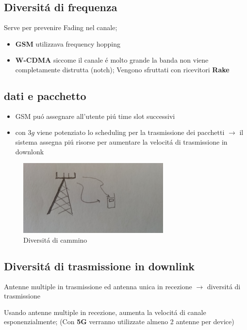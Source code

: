 \documentclass{article}
\begin{document}
\subsection{Diversit\'a di frequenza}
Serve per prevenire Fading nel canale;
\begin{itemize}
    \item \textbf{GSM} utilizzava frequency hopping
    \item \textbf{W-CDMA} siccome il canale \'e molto grande la banda non viene completamente distrutta (notch); Vengono sfruttati con ricevitori \textbf{Rake}
\end{itemize}

\subsection{dati e pacchetto}

\begin{itemize}
    \item GSM pu\'o assegnare all'utente pi\'u time slot successivi
    \item con \textbf{$3g$} viene potenziato lo scheduling per la trasmissione dei pacchetti $\rightarrow$ il sistema assegna pi\'u risorse per aumentare la velocit\'a di trasmissione in downlonk
\end{itemize}

\begin{figure}[h]
    \centering
    \includegraphics[width=3in]{img/diversi_cammini.jpg}
    \caption{Diversit\'a di cammino}
\end{figure}
\subsection{Diversit\'a di trasmissione in downlink}

Antenne multiple in trasmissione ed antenna unica in recezione $\rightarrow$ diversit\'a di trasmissione

Usando antenne multiple in recezione, aumenta la velocit\'a di canale esponenzialmente; (Con \textbf{5G} verranno utilizzate almeno 2 antenne per device)
\end{document}
